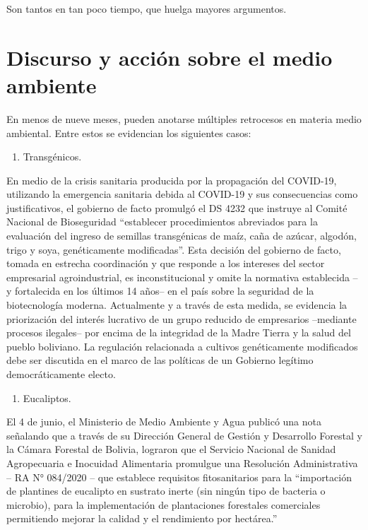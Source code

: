 \documentclass[a4paper, nobind]{templates/ociamthesis}
\providecommand{\tightlist}{%
  \setlength{\itemsep}{0pt}\setlength{\parskip}{0pt}}
\begin{document}
Son tantos en tan poco tiempo, que huelga mayores argumentos.

\hypertarget{discurso-y-acciuxf3n-sobre-el-medio-ambiente}{%
\chapter{Discurso y acción sobre el medio ambiente}\label{discurso-y-acciuxf3n-sobre-el-medio-ambiente}}

En menos de nueve meses, pueden anotarse múltiples retrocesos en materia medio ambiental. Entre estos se evidencian los siguientes casos:

\begin{enumerate}
\def\labelenumi{\arabic{enumi}.}
\tightlist
\item
  Transgénicos.
\end{enumerate}

En medio de la crisis sanitaria producida por la propagación del COVID-19, utilizando la emergencia sanitaria debida al COVID-19 y sus consecuencias como justificativos, el gobierno de facto promulgó el DS 4232 que instruye al Comité Nacional de Bioseguridad ``establecer procedimientos abreviados para la evaluación del ingreso de semillas transgénicas de maíz, caña de azúcar, algodón, trigo y soya, genéticamente modificadas''.
Esta decisión del gobierno de facto, tomada en estrecha coordinación y que responde a los intereses del sector empresarial agroindustrial, es inconstitucional y omite la normativa establecida --y fortalecida en los últimos 14 años-- en el país sobre la seguridad de la biotecnología moderna.
Actualmente y a través de esta medida, se evidencia la priorización del interés lucrativo de un grupo reducido de empresarios --mediante procesos ilegales-- por encima de la integridad de la Madre Tierra y la salud del pueblo boliviano. La regulación relacionada a cultivos genéticamente modificados debe ser discutida en el marco de las políticas de un Gobierno legítimo democráticamente electo.

\begin{enumerate}
\def\labelenumi{\arabic{enumi}.}
\setcounter{enumi}{1}
\tightlist
\item
  Eucaliptos.
\end{enumerate}

El 4 de junio, el Ministerio de Medio Ambiente y Agua publicó una nota señalando que a través de su Dirección General de Gestión y Desarrollo Forestal y la Cámara Forestal de Bolivia, lograron que el Servicio Nacional de Sanidad Agropecuaria e Inocuidad Alimentaria promulgue una Resolución Administrativa -- RA N° 084/2020 -- que establece requisitos fitosanitarios para la ``importación de plantines de eucalipto en sustrato inerte (sin ningún tipo de bacteria o microbio), para la implementación de plantaciones forestales comerciales permitiendo mejorar la calidad y el rendimiento por hectárea.''
\end{document}
